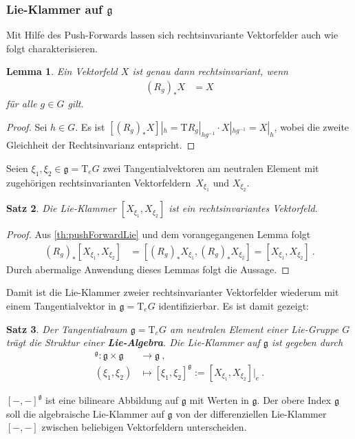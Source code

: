 \documentclass[10pt,a4paper]{article}
\theoremstyle{mytheorem}
\newtheorem{theorem}{Satz}[section]
\newtheorem{proposition}[theorem]{Satz}
\newtheorem{lemma}[theorem]{Lemma}
\theoremstyle{mydefinition}
\newcommand{\mydef}[1]{\textbf{\textit{#1}}}
\newcommand{\Tt}{\mathrm{T}}
\newcommand{\fg}{\mathfrak{g}}
\begin{document}
\subsubsection{Lie-Klammer auf $\mathfrak{g}$}

Mit Hilfe des Push-Forwards lassen sich rechtsinvariante Vektorfelder auch wie folgt charakterisieren.
\begin{lemma}
Ein Vektorfeld $X$ ist genau dann rechtsinvariant, wenn 
\begin{align*}
	(R_g)_*X &= X
\end{align*}
für alle $g\in G$ gilt.
\end{lemma}
\begin{proof}
Sei $h\in G$. Es ist $[(R_g)_*X]|_h=\Tt R_g|_{hg^{-1}}\cdot X|_{hg^{-1}}=X|_h$, wobei die zweite Gleichheit der Rechtsinvarianz entspricht.
\end{proof}

Seien $\xi_1,\xi_2\in\mathfrak{g}=\Tt_eG$ zwei Tangentialvektoren am neutralen Element mit zugehörigen rechtsinvarianten Vektorfeldern~$X_{\xi_1}$ und $X_{\xi_2}$.

\begin{proposition}
Die Lie-Klammer $[X_{\xi_1}, X_{\xi_2}]$ ist ein rechtsinvariantes Vektorfeld.
\end{proposition}
\begin{proof}
Aus \ref{th:pushForwardLie} und dem vorangegangenen Lemma folgt
\begin{align*}
	(R_g)_*[X_{\xi_1}, X_{\xi_2}]
	&= [(R_g)_*X_{\xi_1}, (R_g)_*X_{\xi_2}]
	= [X_{\xi_1}, X_{\xi_2}]
	\ .
\end{align*}
Durch abermalige Anwendung dieses Lemmas folgt die Aussage.
\end{proof}
Damit ist die Lie-Klammer zweier rechtsinvarianter Vektorfelder wiederum mit einem Tangentialvektor in $\fg=\Tt_eG$ identifizierbar.
Es ist damit gezeigt:
\begin{theorem}
Der Tangentialraum $\fg=\Tt_eG$ am neutralen Element einer Lie-Gruppe $G$ trägt die Struktur einer \mydef{Lie-Algebra}.
Die Lie-Klammer auf $\fg$ ist gegeben durch
\begin{align*}
	[-,-]^\mathfrak{g}:
	\mathfrak{g}\times\mathfrak{g}
	&\rightarrow \mathfrak{g}
	\ ,\nonumber\\
	(\xi_1,\xi_2) &\mapsto
	[\xi_1,\xi_2]^\mathfrak{g}
	:= [X_{\xi_1}, X_{\xi_2}]|_e
	\ .
\end{align*}
\end{theorem}
$[-,-]^\fg$ ist eine bilineare Abbildung auf $\mathfrak{g}$ mit Werten in $\mathfrak{g}$.
Der obere Index $\fg$ soll die algebraische Lie-Klammer auf $\fg$ von der differenziellen Lie-Klammer $[-,-]$ zwischen beliebigen Vektorfeldern unterscheiden.
\end{document}
